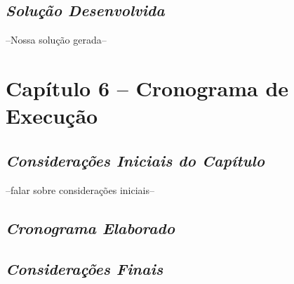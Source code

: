 \section{\textit{Solução Desenvolvida}}
--Nossa solução gerada--

\chapter[Metodologia]{Capítulo 6 – Cronograma de Execução}

\section{\textit{Considerações Iniciais do Capítulo}}

--falar sobre considerações iniciais--

\section{\textit{Cronograma Elaborado}}

\section{\textit{Considerações Finais}}
